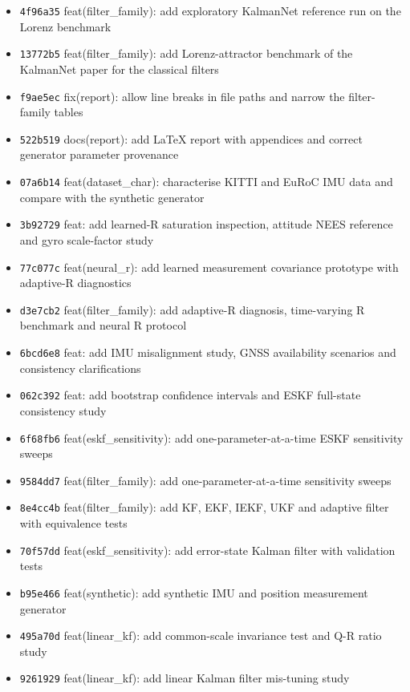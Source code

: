 \begin{itemize}\small
\item \texttt{4f96a35} feat(filter\_family): add exploratory KalmanNet reference run on the Lorenz benchmark
\item \texttt{13772b5} feat(filter\_family): add Lorenz-attractor benchmark of the KalmanNet paper for the classical filters
\item \texttt{f9ae5ec} fix(report): allow line breaks in file paths and narrow the filter-family tables
\item \texttt{522b519} docs(report): add LaTeX report with appendices and correct generator parameter provenance
\item \texttt{07a6b14} feat(dataset\_char): characterise KITTI and EuRoC IMU data and compare with the synthetic generator
\item \texttt{3b92729} feat: add learned-R saturation inspection, attitude NEES reference and gyro scale-factor study
\item \texttt{77c077c} feat(neural\_r): add learned measurement covariance prototype with adaptive-R diagnostics
\item \texttt{d3e7cb2} feat(filter\_family): add adaptive-R diagnosis, time-varying R benchmark and neural R protocol
\item \texttt{6bcd6e8} feat: add IMU misalignment study, GNSS availability scenarios and consistency clarifications
\item \texttt{062c392} feat: add bootstrap confidence intervals and ESKF full-state consistency study
\item \texttt{6f68fb6} feat(eskf\_sensitivity): add one-parameter-at-a-time ESKF sensitivity sweeps
\item \texttt{9584dd7} feat(filter\_family): add one-parameter-at-a-time sensitivity sweeps
\item \texttt{8e4cc4b} feat(filter\_family): add KF, EKF, IEKF, UKF and adaptive filter with equivalence tests
\item \texttt{70f57dd} feat(eskf\_sensitivity): add error-state Kalman filter with validation tests
\item \texttt{b95e466} feat(synthetic): add synthetic IMU and position measurement generator
\item \texttt{495a70d} feat(linear\_kf): add common-scale invariance test and Q-R ratio study
\item \texttt{9261929} feat(linear\_kf): add linear Kalman filter mis-tuning study
\end{itemize}
